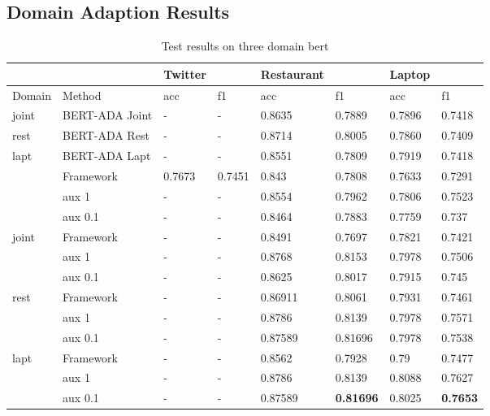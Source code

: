 \documentclass[xcolor=dvipsnames]{beamer}
\begin{document}
\subsection{Domain Adaption Results}

\begin{frame}
  \begin{table}
    \centering
    \tiny
    \caption{Test results on three domain bert}
    \label{domain-res} 



    \begin{tabular}{llllllll}
    \hline
           &           & Twitter &        & Restaurant &         & Laptop &        \\ \hline
    Domain & Method    & acc      & f1     & acc         & f1      & acc    & f1     \\ \hline

    joint&BERT-ADA Joint  &{-}&{-} &{0.8635}&{0.7889} &{0.7896}&{0.7418} \\ \hline
    rest&BERT-ADA Rest  &{-}&{-} &{0.8714}&{0.8005} &{0.7860}&{0.7409}\\ \hline
    lapt&BERT-ADA Lapt  &{-}&{-} &{0.8551}&{0.7809}&{0.7919}&{0.7418} \\ \hline
    \midrule
           & Framework & 0.7673   & 0.7451 & 0.843       & 0.7808  & 0.7633 & 0.7291 \\ \hline
           & aux 1     & -        & -      & 0.8554      & 0.7962  & 0.7806 & 0.7523 \\ \hline
           & aux 0.1   & -        & -      & 0.8464      & 0.7883  & 0.7759 & 0.737  \\ \hline
    joint  & Framework & -        & -      & 0.8491      & 0.7697  & 0.7821 & 0.7421 \\ \hline
           & aux 1     & -        & -      & 0.8768      & 0.8153  & 0.7978 & 0.7506 \\ \hline
           & aux 0.1   & -        & -      & 0.8625      & 0.8017  & 0.7915 & 0.745  \\ \hline
           rest    & Framework & -        & -      & 0.86911     & 0.8061  & 0.7931 & 0.7461 \\ \hline
           & aux 1     & -        & -      & 0.8786      & 0.8139  & 0.7978 & 0.7571 \\ \hline
           & aux 0.1   & -        & -      & 0.87589     & 0.81696 & 0.7978 & 0.7538 \\ \hline
    lapt    & Framework & -        & -      & 0.8562      & 0.7928  & 0.79   & 0.7477 \\ \hline
           & aux 1     & -        & -      & 0.8786      & 0.8139  & 0.8088 & 0.7627 \\ \hline
           & aux 0.1   & -        & -      & 0.87589     & \textbf{0.81696} & 0.8025 & \textbf{0.7653} \\ \hline
    \end{tabular}
    \end{table}
  \end{frame}
\end{document}
